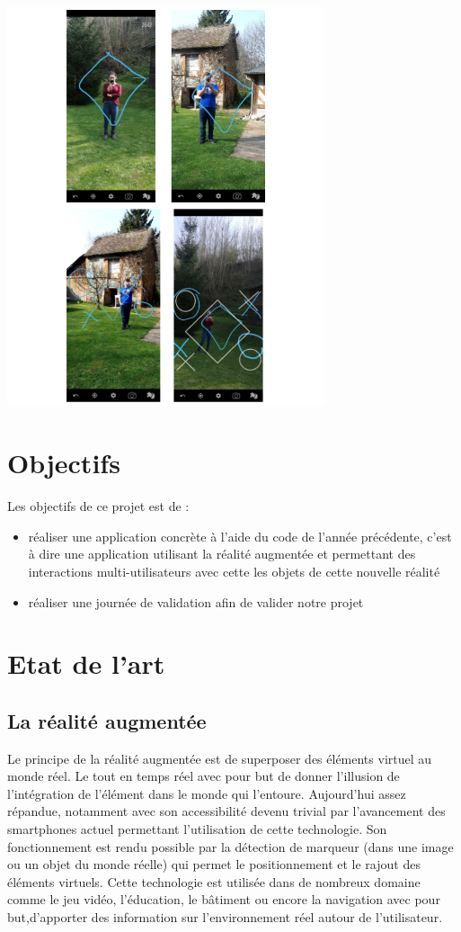 \documentclass[12pt]{article}
\begin{document}
\begin{center}		\includegraphics[width=0.7\textwidth]{intro.png}
\end{center}



\section{Objectifs}
Les objectifs de ce projet est de :
\begin{itemize}
\item réaliser une application concrète à l'aide du code de l'année précédente, c'est à dire une application utilisant la réalité augmentée et permettant des interactions multi-utilisateurs avec cette les objets de cette nouvelle réalité
\item réaliser une journée de validation afin de valider notre projet
\end{itemize}


\section{Etat de l'art}
\subsection{La réalité augmentée}
Le principe de la réalité augmentée est de superposer des éléments virtuel au monde réel. Le tout en temps réel avec pour but de donner l'illusion de l'intégration de l'élément dans le monde qui l'entoure. Aujourd'hui assez répandue, notamment avec son accessibilité devenu trivial par l'avancement des smartphones actuel permettant l'utilisation de cette technologie.
Son fonctionnement est rendu possible par la détection de marqueur (dans une image ou un objet du monde réelle) qui permet le positionnement et le rajout des éléments virtuels. 
Cette technologie est utilisée dans de nombreux domaine comme le jeu vidéo, l'éducation, le bâtiment ou encore la navigation avec pour but,d'apporter des information sur l'environnement réel autour de l'utilisateur.
\end{document}
